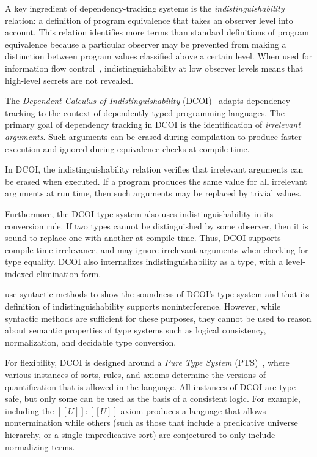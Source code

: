 \documentclass[acmsmall]{acmart}
\makeatletter
\theoremstyle{linked}
\theoremstyle{deflinked}
\theoremstyle{acmdefinition}
\newcommand{\dcoi}{DCOI\@\xspace}
\newcommand{\longname}{Dependent Calculus of Indistinguishability\@\xspace}
\makeatother
\begin{document}
A key ingredient of dependency-tracking systems is the
\emph{indistinguishability} relation: a definition of program equivalence that
takes an observer level into account. This relation identifies more terms
than standard definitions of program equivalence because a particular
observer may be prevented from making a distinction between program values
classified above a certain level. When used for information flow
control~\cite{abadi:dcc}, indistinguishability at low observer levels means
that high-level secrets are not revealed.

The \emph{\longname} (\dcoi)~\cite{liu:dcoi} adapts dependency tracking to the
context of dependently typed programming languages. The primary goal of
dependency tracking in \dcoi is the identification of \emph{irrelevant
  arguments}.  Such arguments can be erased during compilation to produce
faster execution and ignored during equivalence checks at compile time.

In \dcoi, the indistinguishability relation verifies that irrelevant arguments
can be erased when executed. If a program produces the same value for all
irrelevant arguments at run time, then such arguments may
be replaced by trivial values.

Furthermore, the \dcoi type system also uses indistinguishability in its
conversion rule. If two types cannot be distinguished by some observer, then
it is sound to replace one with another at compile time. Thus, \dcoi supports
compile-time irrelevance, and may ignore irrelevant arguments when checking
for type equality. \dcoi also internalizes indistinguishability as a type,
with a level-indexed elimination form.

\citet{liu:dcoi} use syntactic methods to show the soundness of \dcoi's type
system and that its definition of indistinguishability supports
noninterference. However, while syntactic methods are sufficient for these
purposes, they cannot be used to reason about semantic properties of type
systems such as logical consistency, normalization, and decidable
type conversion.

For flexibility, \dcoi is designed around a \emph{Pure Type System}
(PTS)~\citep{barendregt:PTS},
where various instances of sorts, rules, and axioms determine the versions of
quantification that is allowed in the language. All instances of \dcoi are
type safe, but only some can be used as the basis of a consistent logic. For
example, including the $[[U]] : [[U]]$ axiom produces a language that allows
nontermination while others (such as those that include a predicative universe
hierarchy, or a single impredicative sort) are conjectured to only
include normalizing terms.
\end{document}
